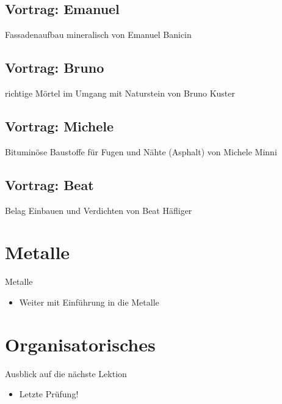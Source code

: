 \subsection{Vortrag: Emanuel}
\begin{frame}{Fassadenaufbau mineralisch}
    von Emanuel Banicin
\end{frame}

\subsection{Vortrag: Bruno}
\begin{frame}{richtige Mörtel im Umgang mit Naturstein}
    von Bruno Kuster
\end{frame}


\subsection{Vortrag: Michele}
\begin{frame}{Bituminöse Baustoffe für Fugen und Nähte (Asphalt)}
    von Michele Minni
\end{frame}

\subsection{Vortrag: Beat}
\begin{frame}{Belag   Einbauen und Verdichten}
    von Beat Häfliger
\end{frame}


\section{Metalle}
\BlueSectionSlide

\begin{frame}{Metalle}
\begin{itemize}
    \item[\textbullet] Weiter mit Einführung in die Metalle
\end{itemize}
\end{frame}



\section{Organisatorisches}
\BlueSectionSlide







\begin{frame}{Ausblick auf die nächste Lektion}
\begin{itemize}
    \item[\textbullet] Letzte Prüfung!
\end{itemize}
\end{frame}



